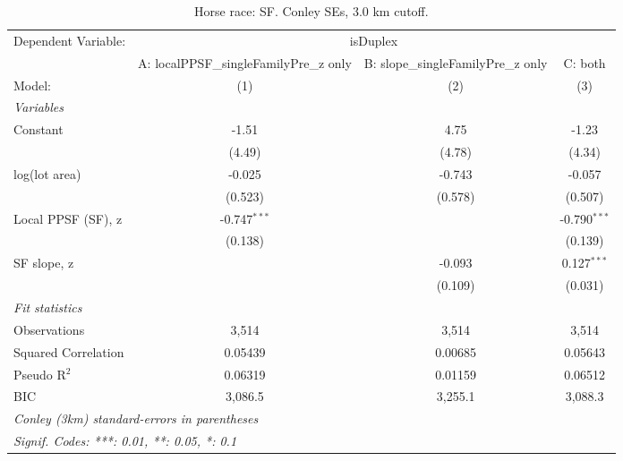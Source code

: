 
\begin{table}[htbp]
   \caption{\label{tab:horseRace_SF_conley} Horse race: SF. Conley SEs, 3.0 km cutoff.}
   \centering
   \begin{tabular}{lccc}
      \tabularnewline \midrule \midrule
      Dependent Variable: & \multicolumn{3}{c}{isDuplex}\\
                          & A: localPPSF\_singleFamilyPre\_z only   & B: slope\_singleFamilyPre\_z only   & C: both \\   
      Model:              & (1)                                     & (2)                                 & (3)\\  
      \midrule
      \emph{Variables}\\
      Constant            & -1.51                                   & 4.75                                & -1.23\\   
                          & (4.49)                                  & (4.78)                              & (4.34)\\   
      log(lot area)       & -0.025                                  & -0.743                              & -0.057\\   
                          & (0.523)                                 & (0.578)                             & (0.507)\\   
      Local PPSF (SF), z  & -0.747$^{***}$                          &                                     & -0.790$^{***}$\\   
                          & (0.138)                                 &                                     & (0.139)\\   
      SF slope, z         &                                         & -0.093                              & 0.127$^{***}$\\   
                          &                                         & (0.109)                             & (0.031)\\   
      \midrule
      \emph{Fit statistics}\\
      Observations        & 3,514                                   & 3,514                               & 3,514\\  
      Squared Correlation & 0.05439                                 & 0.00685                             & 0.05643\\  
      Pseudo R$^2$        & 0.06319                                 & 0.01159                             & 0.06512\\  
      BIC                 & 3,086.5                                 & 3,255.1                             & 3,088.3\\  
      \midrule \midrule
      \multicolumn{4}{l}{\emph{Conley (3km) standard-errors in parentheses}}\\
      \multicolumn{4}{l}{\emph{Signif. Codes: ***: 0.01, **: 0.05, *: 0.1}}\\
   \end{tabular}
\end{table}


